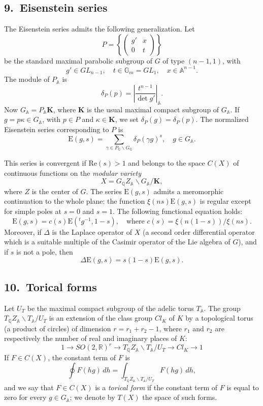 \documentclass[12pt]{article}
\begin{document}
\subsection*{9.\ Eisenstein series}

The Eisenstein series admits the following generalization. Let
\[
P = \left\{ \begin{pmatrix} g' & x \\ 0 & t \end{pmatrix} \right\}
\]
be the standard maximal parabolic subgroup of $G$ of type $(n-1, 1)$, with
\[
g' \in GL_{n-1}, \quad t \in \mathbb{G}_m = GL_1, \quad x \in \mathbb{A}^{n-1}.
\]
The module of $P_{\mathbb{A}}$ is
\[
\delta_P(p) = \left| \frac{t^{n-1}}{\det g'} \right|_{\mathbb{A}}.
\]
Now $G_{\mathbb{A}} = P_{\mathbb{A}} \mathbf{K}$, where $\mathbf{K}$ is the usual maximal compact subgroup of $G_{\mathbb{A}}$. If $g = p\kappa \in G_{\mathbb{A}}$, with $p \in P$ and $\kappa \in \mathbf{K}$, we set $\delta_P(g) = \delta_P(p)$. The normalized Eisenstein series corresponding to $P$ is
\[
\text{E}(g, s) = \sum_{\gamma \in P_{\mathbb{Q}} \backslash G_{\mathbb{Q}}} \delta_P(\gamma g)^s, \quad g \in G_{\mathbb{A}}.
\]

This series is convergent if $\text{Re}(s) > 1$ and belongs to the space $C(X)$ of continuous functions on the \emph{modular variety}
\[
X = G_{\mathbb{Q}} Z_{\mathbb{A}} \backslash G_{\mathbb{A}} / \mathbf{K},
\]
where $Z$ is the center of $G$. The series $\text{E}(g, s)$ admits a meromorphic continuation to the whole plane: the function $\xi(ns) \text{E}(g, s)$ is regular except for simple poles at $s = 0$ and $s = 1$. The following functional equation holds:
\[
\text{E}(g, s) = c(s) \text{E}({}^t g^{-1}, 1-s), \quad \text{where } c(s) = \xi(n(1-s)) / \xi(ns).
\]
Moreover, if $\Delta$ is the Laplace operator of $X$ (a second order differential operator which is a suitable multiple of the Casimir operator of the Lie algebra of $G$), and if $s$ is not a pole, then
\[
\Delta \text{E}(g, s) = s(1-s) \text{E}(g, s).
\]

\subsection*{10.\ Torical forms}

Let $U_T$ be the maximal compact subgroup of the adelic torus $T_{\mathbb{A}}$. The group $T_{\mathbb{Q}} Z_{\mathbb{A}} \backslash T_{\mathbb{A}} / U_T$ is an extension of the class group $Cl_K$ of $K$ by a topological torus (a product of circles) of dimension $r = r_1 + r_2 - 1$, where $r_1$ and $r_2$ are respectively the number of real and imaginary places of $K$:
\[
1 \longrightarrow SO(2, \mathbb{R})^r \longrightarrow T_{\mathbb{Q}} Z_{\mathbb{A}} \backslash T_{\mathbb{A}} / U_T \longrightarrow Cl_K \longrightarrow 1
\]
If $F \in C(X)$, the constant term of $F$ is
\[
\oint F(hg)\,dh = \int_{T_{\mathbb{Q}} Z_{\mathbb{A}} \backslash T_{\mathbb{A}} / U_T} F(hg)\,dh,
\]
and we say that $F \in C(X)$ is a \emph{torical form} if the constant term of $F$ is equal to zero for every $g \in G_{\mathbb{A}}$; we denote by $T(X)$ the space of such forms.
\end{document}
